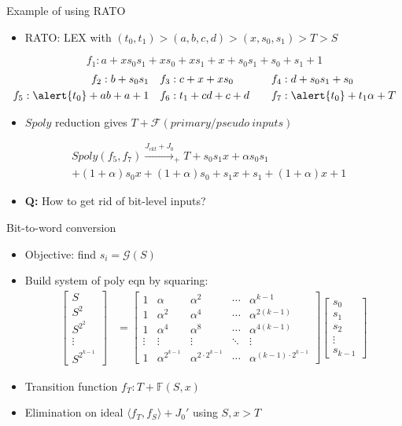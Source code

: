 \documentclass[xcolor=dvipsnames]{beamer}
\newcommand{\bi}{\begin{itemize}}
\newcommand{\ei}{\end{itemize}}
\newcommand{\Func}{{\mathcal{F}}}
\newcommand{\F}{{\mathbb{F}}}
\begin{document}
\begin{frame}{\large{Example of using RATO}}
\bi
\item RATO: LEX with $(t_0,t_1)>(a,b,c,d)>(x,s_0,s_1)>T>S$
\ei
\begin{equation*}
f_1: a+xs_0s_1+xs_0+xs_1+x+s_0s_1+s_0+s_1+1
\end{equation*}
\vspace{-0.8cm}
\begin{alignat*}{2}
f_2: b+s_0s_1 &~~~ f_3: c+x+xs_0 &&~~~f_4: d+s_0s_1+s_0 \\
f_5: \alert{t_0}+ab+a+1 &~~~ f_6: t_1+cd+c+d &&~~~ f_7: \alert{t_0}+t_1\alpha+T 
\end{alignat*}
\bi
\item $Spoly$ reduction gives $T+\Func(primary/pseudo~inputs)$
\ei
\begin{align}
&Spoly(f_5,f_7) \xrightarrow{J_{ckt}+J_0}_{+}T + s_0 s_1 x+\alpha s_0 s_1 \nonumber\\
&+(1+\alpha)s_0 x+(1+\alpha) s_0+s_1 x+s_1+(1+\alpha) x+1\nonumber
\end{align}
\bi
\item {\bf Q:} How to get rid of bit-level inputs?
\ei
\end{frame}
\begin{frame}{\large{Bit-to-word conversion}}
\bi
\item Objective: find $s_i = \mathcal G(S)$
\item Build system of poly eqn by squaring:
\begin{align*}
\label{eqn:alphamat}
\begin{bmatrix}
S \\
S^2 \\
S^{2^2} \\
\vdots \\
S^{2^{k-1}}
\end{bmatrix}
&=
\begin{bmatrix}
1 & \alpha & \alpha^{2} & \cdots & \alpha^{{k-1}}\\
1 & \alpha^{2} & \alpha^{4} & \cdots & \alpha^{2(k-1)} \\
1 & \alpha^{4} & \alpha^{8} & \cdots & \alpha^{4(k-1)}\\
\vdots & \vdots & \vdots & \ddots & \vdots \\
1 & \alpha^{2^{k-1}} & \alpha^{2\cdot 2^{k-1}} & \cdots & \alpha^{(k-1)\cdot 2^{k-1}}
\end{bmatrix}
\begin{bmatrix}
s_0\\
s_1\\
s_2\\
\vdots\\
s_{k-1}
\end{bmatrix}
\end{align*}
\item Transition function $f_T: T+\F(S,x)$
\item Elimination on ideal $\langle f_T,f_S \rangle+J_0'$ using $S,x > T$
\ei
\end{frame}
\end{document}
